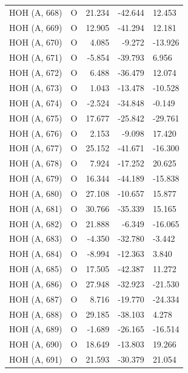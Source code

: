 \begin{longtable}{@{}lcrr@{}}
  \cmidrule(r){1-5}
  HOH (A, 668) & O & 21.234 & -42.644 & 12.453 \\
  \cmidrule(r){1-5}
  HOH (A, 669) & O & 12.905 & -41.294 & 12.181 \\
  \cmidrule(r){1-5}
  HOH (A, 670) & O & 4.085 & -9.272 & -13.926 \\
  \cmidrule(r){1-5}
  HOH (A, 671) & O & -5.854 & -39.793 & 6.956 \\
  \cmidrule(r){1-5}
  HOH (A, 672) & O & 6.488 & -36.479 & 12.074 \\
  \cmidrule(r){1-5}
  HOH (A, 673) & O & 1.043 & -13.478 & -10.528 \\
  \cmidrule(r){1-5}
  HOH (A, 674) & O & -2.524 & -34.848 & -0.149 \\
  \cmidrule(r){1-5}
  HOH (A, 675) & O & 17.677 & -25.842 & -29.761 \\
  \cmidrule(r){1-5}
  HOH (A, 676) & O & 2.153 & -9.098 & 17.420 \\
  \cmidrule(r){1-5}
  HOH (A, 677) & O & 25.152 & -41.671 & -16.300 \\
  \cmidrule(r){1-5}
  HOH (A, 678) & O & 7.924 & -17.252 & 20.625 \\
  \cmidrule(r){1-5}
  HOH (A, 679) & O & 16.344 & -44.189 & -15.838 \\
  \cmidrule(r){1-5}
  HOH (A, 680) & O & 27.108 & -10.657 & 15.877 \\
  \cmidrule(r){1-5}
  HOH (A, 681) & O & 30.766 & -35.339 & 15.165 \\
  \cmidrule(r){1-5}
  HOH (A, 682) & O & 21.888 & -6.349 & -16.065 \\
  \cmidrule(r){1-5}
  HOH (A, 683) & O & -4.350 & -32.780 & -3.442 \\
  \cmidrule(r){1-5}
  HOH (A, 684) & O & -8.994 & -12.363 & 3.840 \\
  \cmidrule(r){1-5}
  HOH (A, 685) & O & 17.505 & -42.387 & 11.272 \\
  \cmidrule(r){1-5}
  HOH (A, 686) & O & 27.948 & -32.923 & -21.530 \\
  \cmidrule(r){1-5}
  HOH (A, 687) & O & 8.716 & -19.770 & -24.334 \\
  \cmidrule(r){1-5}
  HOH (A, 688) & O & 29.185 & -38.103 & 4.278 \\
  \cmidrule(r){1-5}
  HOH (A, 689) & O & -1.689 & -26.165 & -16.514 \\
  \cmidrule(r){1-5}
  HOH (A, 690) & O & 18.649 & -13.803 & 19.266 \\
  \cmidrule(r){1-5}
  HOH (A, 691) & O & 21.593 & -30.379 & 21.054 \\

\end{longtable}
